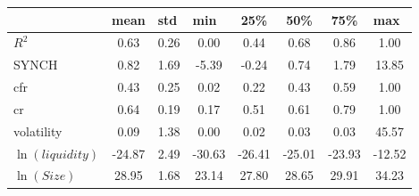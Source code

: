     \begin{tabular}{lccccccc}
    	\hline\hline
	& \multicolumn{1}{l}{mean} & \multicolumn{1}{l}{std} & \multicolumn{1}{l}{min} & 25\%  & 50\%  & 75\%  & \multicolumn{1}{l}{max} \\
	\hline
	$ R^2 $ & 0.63  & 0.26  & 0.00  & 0.44  & 0.68  & 0.86  & 1.00 \\
	SYNCH & 0.82  & 1.69  & -5.39 & -0.24 & 0.74  & 1.79  & 13.85 \\
	cfr   & 0.43  & 0.25  & 0.02  & 0.22  & 0.43  & 0.59  & 1.00 \\
	cr    & 0.64  & 0.19  & 0.17  & 0.51  & 0.61  & 0.79  & 1.00 \\
	volatility & 0.09  & 1.38  & 0.00  & 0.02  & 0.03  & 0.03  & 45.57 \\
	 $ \ln(liquidity) $ & -24.87 & 2.49  & -30.63 & -26.41 & -25.01 & -23.93 & -12.52 \\
	$ \ln(Size) $  & 28.95 & 1.68  & 23.14 & 27.80 & 28.65 & 29.91 & 34.23 \\
	
	\hline\hline
\end{tabular}%
